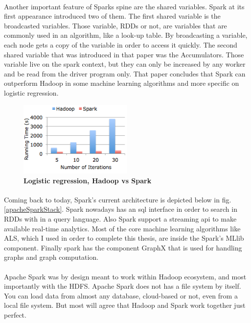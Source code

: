 \paragraph{}Another important feature of Sparks spine are the shared variables. Spark at its first appearance introduced two of them. The first shared variable is the broadcasted variables. Those variable, RDDs or not, are variables that are commonly used in an algorithm, like a look-up table. By broadcasting a variable, each node gets a copy of the variable in order to access it quickly. The second shared variable that was introduced in that paper was the Accumulators. Those variable live on the spark context, but they can only be increased by any worker and be read from the driver program only. That paper concludes that Spark can outperform Hadoop in some machine learning algorithms and more specific on logistic regression.

\begin{figure}[ht]
  \centering
    \includegraphics[width=0.5\textwidth]{images/hadoopVsSpark.png}
    \caption{\bfseries Logistic regression, Hadoop vs Spark \cite{HadoopVsSpark}}
   \label{hadoopVsSpark}
\end{figure}

\paragraph{}Coming back to today, Spark's current architecture is depicted below in fig. \ref{apacheSparkStack}. Spark nowadays has an sql interface in order to search in RDDs with in a query language. Also Spark support a streaming api to make available real-time analytics. Most of the core machine learning algorithms like ALS, which I used in order to complete this thesis, are inside the Spark's MLlib component. Finally spark has the component GraphX that is used for handling graphs and graph computation.

\paragraph{}Apache Spark was by design meant to work within Hadoop ecosystem, and most importantly with the HDFS. Apache Spark does not has a file system by itself. You can load data from almost any database, cloud-based or not, even from a local file system. But most will agree that Hadoop and Spark work together just perfect.

